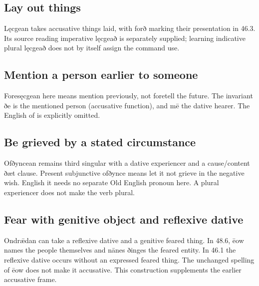 \subsection*{Lay out things}

Lęcgean takes accusative things laid, with forð marking their presentation in 46.3. Its source reading imperative lęcgeað is separately supplied; learning indicative plural lęcgeað does not by itself assign the command use.

\subsection*{Mention a person earlier to someone}

Foresęcgean here means mention previously, not foretell the future. The invariant ðe is the mentioned person (accusative function), and mē the dative hearer. The English of is explicitly omitted.

\subsection*{Be grieved by a stated circumstance}

Ofðyncean remains third singular with a dative experiencer and a cause/\allowbreak{}content ðæt clause. Present subjunctive ofðynce means let it not grieve in the negative wish. English it needs no separate Old English pronoun here. A plural experiencer does not make the verb plural.

\subsection*{Fear with genitive object and reflexive dative}

Ondrǣdan can take a reflexive dative and a genitive feared thing. In 48.6, ēow names the people themselves and nānes ðinges the feared entity. In 46.1 the reflexive dative occurs without an expressed feared thing. The unchanged spelling of ēow does not make it accusative. This construction supplements the earlier accusative frame.

